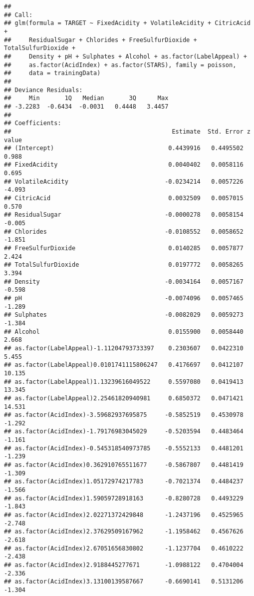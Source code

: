 \documentclass[
]{article}
\begin{document}
\begin{verbatim}
## 
## Call:
## glm(formula = TARGET ~ FixedAcidity + VolatileAcidity + CitricAcid + 
##     ResidualSugar + Chlorides + FreeSulfurDioxide + TotalSulfurDioxide + 
##     Density + pH + Sulphates + Alcohol + as.factor(LabelAppeal) + 
##     as.factor(AcidIndex) + as.factor(STARS), family = poisson, 
##     data = trainingData)
## 
## Deviance Residuals: 
##     Min       1Q   Median       3Q      Max  
## -3.2283  -0.6434  -0.0031   0.4448   3.4457  
## 
## Coefficients:
##                                             Estimate  Std. Error z value
## (Intercept)                                0.4439916   0.4495502   0.988
## FixedAcidity                               0.0040402   0.0058116   0.695
## VolatileAcidity                           -0.0234214   0.0057226  -4.093
## CitricAcid                                 0.0032509   0.0057015   0.570
## ResidualSugar                             -0.0000278   0.0058154  -0.005
## Chlorides                                 -0.0108552   0.0058652  -1.851
## FreeSulfurDioxide                          0.0140285   0.0057877   2.424
## TotalSulfurDioxide                         0.0197772   0.0058265   3.394
## Density                                   -0.0034164   0.0057167  -0.598
## pH                                        -0.0074096   0.0057465  -1.289
## Sulphates                                 -0.0082029   0.0059273  -1.384
## Alcohol                                    0.0155900   0.0058440   2.668
## as.factor(LabelAppeal)-1.11204793733397    0.2303607   0.0422310   5.455
## as.factor(LabelAppeal)0.0101741115806247   0.4176697   0.0412107  10.135
## as.factor(LabelAppeal)1.13239616049522     0.5597080   0.0419413  13.345
## as.factor(LabelAppeal)2.25461820940981     0.6850372   0.0471421  14.531
## as.factor(AcidIndex)-3.59682937695875     -0.5852519   0.4530978  -1.292
## as.factor(AcidIndex)-1.79176983045029     -0.5203594   0.4483464  -1.161
## as.factor(AcidIndex)-0.545318540973785    -0.5552133   0.4481201  -1.239
## as.factor(AcidIndex)0.362910765511677     -0.5867807   0.4481419  -1.309
## as.factor(AcidIndex)1.05172974217783      -0.7021374   0.4484237  -1.566
## as.factor(AcidIndex)1.59059728918163      -0.8280728   0.4493229  -1.843
## as.factor(AcidIndex)2.02271372429848      -1.2437196   0.4525965  -2.748
## as.factor(AcidIndex)2.37629509167962      -1.1958462   0.4567626  -2.618
## as.factor(AcidIndex)2.67051656830802      -1.1237704   0.4610222  -2.438
## as.factor(AcidIndex)2.9188445277671       -1.0988122   0.4704004  -2.336
## as.factor(AcidIndex)3.13100139587667      -0.6690141   0.5131206  -1.304

\end{verbatim}
\end{document}
